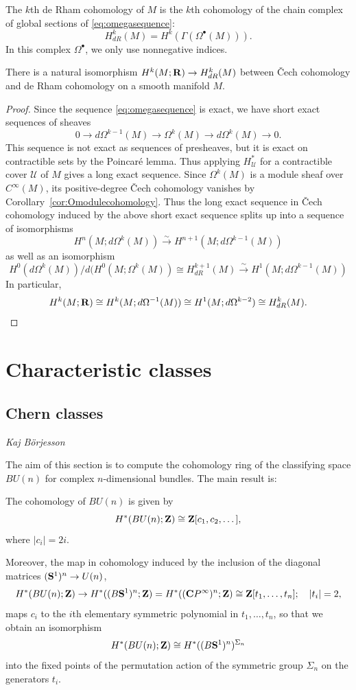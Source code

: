 \documentclass[a4paper,openany]{scrbook}
\newcommand{\chapterauthor}[1]{\hfill\emph{#1}\par\noindent}
\begin{document}
\begin{defn}
The $k$th de Rham cohomology of $M$ is the $k$th cohomology of the chain complex of global sections of \eqref{eq:omegasequence}:
\[
H^k_{dR}(M) = H^k(\Gamma(\Omega^\bullet(M))).
\]
In this complex $\Omega^\bullet$, we only use nonnegative indices.
\end{defn}

\begin{thm}
There is a natural isomorphism $H^k(M;\R) \to H^k_{dR}(M)$ between \v Cech cohomology and de Rham cohomology on a smooth manifold $M$.
\end{thm}
\begin{proof}
Since the sequence \eqref{eq:omegasequence} is exact, we have short exact sequences of sheaves
\[
0 \to d\Omega^{k-1}(M) \to \Omega^k(M) \to d\Omega^k(M) \to 0.
\]
This sequence is not exact as sequences of presheaves, but it is exact on contractible sets by the Poincaré lemma. Thus applying $H^*_{\mathcal U}$ for a contractible cover $\mathcal U$ of $M$ gives a long exact sequence. Since $\Omega^k(M)$ is a module sheaf over $C^\infty(M)$, its positive-degree \v Cech cohomology vanishes by Corollary~\ref{cor:Omodulecohomology}. Thus the long exact sequence in \v Cech cohomology induced by the above short exact sequence splits up into a sequence of isomorphisms
\[
H^n(M;d\Omega^k(M)) \xrightarrow{\sim} H^{n+1}(M;d\Omega^{k-1}(M))
\]
as well as an isomorphism
\[
H^0(d\Omega^k(M))/d(H^0(M;\Omega^{k}(M)) \cong H^{k+1}_{dR}(M) \xrightarrow{\sim} H^1(M;d\Omega^{k-1}(M)) 
\]
In particular,
\[
H^k(M;\R) \cong H^k(M;d\Omega^{-1}(M)) \cong H^1(M;d\Omega^{k-2}) \cong H^k_{dR}(M).
\]
\end{proof}

\chapter{Characteristic classes}

\section{Chern classes}\label{sec:chernclasses}
\chapterauthor{Kaj Börjesson}

The aim of this section is to compute the cohomology ring of the classifying space $BU(n)$ for complex $n$-dimensional bundles. The main result is:

\begin{thm}
The cohomology of $BU(n)$ is given by
\[
H^*(BU(n);\Z) \cong \Z[c_1,c_2,\dots],
\]
where $|c_i|=2i$.

Moreover, the map in cohomology induced by the inclusion of the diagonal matrices $(\S^1)^n \to U(n)$,
\[
H^*(BU(n);\Z) \to H^*((B\S^1)^n;\Z) = H^*((\CC P^\infty)^n;\Z) \cong \Z[t_1,\dots,t_n]; \quad |t_i| = 2,
\]
maps $c_i$ to the $i$th elementary symmetric polynomial in $t_1,\dots,t_n$, so that we obtain an isomorphism
\[
H^*(BU(n);\Z) \cong H^*((B\S^1)^n)^{\Sigma_n}
\]
into the fixed points of the permutation action of the symmetric group $\Sigma_n$ on the generators $t_i$.
\end{thm}
\end{document}
